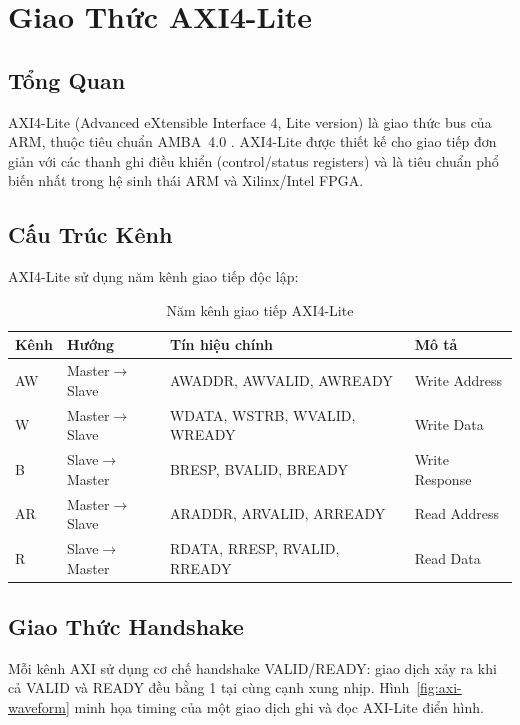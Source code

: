 \section{Giao Thức AXI4-Lite}

\subsection{Tổng Quan}

AXI4-Lite (Advanced eXtensible Interface 4, Lite version) là giao thức bus của ARM, thuộc tiêu chuẩn AMBA~4.0 \cite{amba-axi-spec}. AXI4-Lite được thiết kế cho giao tiếp đơn giản với các thanh ghi điều khiển (control/status registers) và là tiêu chuẩn phổ biến nhất trong hệ sinh thái ARM và Xilinx/Intel FPGA.

\subsection{Cấu Trúc Kênh}

AXI4-Lite sử dụng năm kênh giao tiếp độc lập:

\begin{table}[htbp]
\caption{Năm kênh giao tiếp AXI4-Lite}
\label{tab:axi-channels}
\begin{center}
\begin{tabular}{|l|l|l|l|}
\hline
\textbf{Kênh} & \textbf{Hướng} & \textbf{Tín hiệu chính} & \textbf{Mô tả} \\ \hline
AW & Master$\rightarrow$Slave & AWADDR, AWVALID, AWREADY & Write Address \\ \hline
W & Master$\rightarrow$Slave & WDATA, WSTRB, WVALID, WREADY & Write Data \\ \hline
B & Slave$\rightarrow$Master & BRESP, BVALID, BREADY & Write Response \\ \hline
AR & Master$\rightarrow$Slave & ARADDR, ARVALID, ARREADY & Read Address \\ \hline
R & Slave$\rightarrow$Master & RDATA, RRESP, RVALID, RREADY & Read Data \\ \hline
\end{tabular}
\end{center}
\end{table}

\subsection{Giao Thức Handshake}

Mỗi kênh AXI sử dụng cơ chế handshake VALID/READY: giao dịch xảy ra khi cả VALID và READY đều bằng 1 tại cùng cạnh xung nhịp. Hình~\ref{fig:axi-waveform} minh họa timing của một giao dịch ghi và đọc AXI-Lite điển hình.

